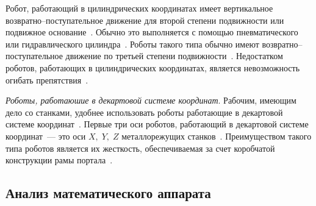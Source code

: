 \documentclass[oneside, final, 14pt]{extarticle}
\begin{document}
Робот, работающий в цилиндрических координатах имеет вертикальное возвратно--поступательное движение для второй степени подвижности или подвижное основание~\cite{asfal:rob_auto}.
Обычно это выполняется с помощью пневматического или гидравлического цилиндра~\cite{asfal:rob_auto}.
Роботы такого типа обычно имеют возвратно--поступательное движение по третьей степени подвижности~\cite{asfal:rob_auto}.
Недостатком роботов, работающих в цилиндрических координатах, является невозможность огибать препятствия~\cite{asfal:rob_auto}.
\par
{\itshape Роботы, работаюшие в декартовой системе координат}.
Рабочим, имеющим дело со станками, удобнее использовать роботы работающие в декартовой системе координат~\cite{asfal:rob_auto}.
Первые три оси роботов, работающий в декартовой системе координат~--- это оси \(X,\;Y,\;Z\) металлорежущих станков~\cite{asfal:rob_auto}.
Преимуществом такого типа роботов является их жесткость, обеспечиваемая за счет коробчатой конструкции рамы портала~\cite{asfal:rob_auto}.

\subsection{Анализ математического аппарата}
\end{document}
